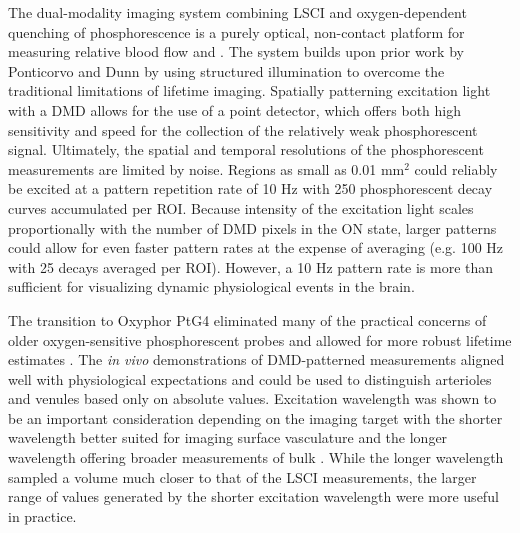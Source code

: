 The dual-modality imaging system combining LSCI and oxygen-dependent quenching of phosphorescence is a purely optical, non-contact platform for measuring relative blood flow and . The system builds upon prior work by Ponticorvo and Dunn \cite{Ponticorvo:2010uv} by using structured illumination to overcome the traditional limitations of lifetime imaging. Spatially patterning excitation light with a DMD allows for the use of a point detector, which offers both high sensitivity and speed for the collection of the relatively weak phosphorescent signal. Ultimately, the spatial and temporal resolutions of the phosphorescent measurements are limited by noise. Regions as small as 0.01 mm$^2$ could reliably be excited at a pattern repetition rate of 10 Hz with 250 phosphorescent decay curves accumulated per ROI. Because intensity of the excitation light scales proportionally with the number of DMD pixels in the ON state, larger patterns could allow for even faster pattern rates at the expense of averaging (e.g. 100 Hz with 25 decays averaged per ROI). However, a 10 Hz pattern rate is more than sufficient for visualizing dynamic physiological events in the brain.

The transition to Oxyphor PtG4 eliminated many of the practical concerns of older oxygen-sensitive phosphorescent probes and allowed for more robust lifetime estimates \cite{Esipova:2011hi}. The \textit{in vivo} demonstrations of DMD-patterned  measurements aligned well with physiological expectations and could be used to distinguish arterioles and venules based only on absolute  values. Excitation wavelength was shown to be an important consideration depending on the imaging target with the shorter wavelength better suited for imaging surface vasculature and the longer wavelength offering broader measurements of bulk . While the longer wavelength sampled a volume much closer to that of the LSCI measurements, the larger range of  values generated by the shorter excitation wavelength were more useful in practice.



